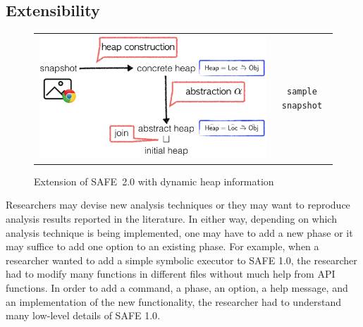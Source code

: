 \documentclass[10pt, conference]{IEEEtran}
\newcommand{\oldsafe}{{SAFE 1.0}\xspace}
\newcommand{\safe}{{SAFE~2.0}\xspace}
\begin{document}
\subsection{Extensibility}
\setcounter{figure}{2}
\begin{figure}[t]
\begin{tabular}{c|c|}\cline{2-2}
\begin{minipage}{.52\textwidth}
\includegraphics[width=\textwidth]{seip}
\end{minipage}
&
\begin{minipage}{.44\textwidth}
\small
\begin{verbatim}
sample snapshot
\end{verbatim}
\end{minipage}
\\\cline{2-2}
\end{tabular}
\vspace*{.5em}
\caption{\small Extension of \safe with dynamic heap information~\cite{safehybrid}}
\label{fig:seip}
\end{figure}

Researchers may devise new analysis techniques or they may want to
reproduce analysis results reported in the literature.  In either way,
depending on which analysis technique is being implemented, one may
have to add a new phase or it may suffice to add one option to an
existing phase.  For example, when a researcher wanted to add
a simple symbolic executor to \oldsafe, the researcher had to modify
many functions in different files without much help from API functions.
In order to add a command, a phase, an option, a help message, and an
implementation of the new functionality, the researcher had to understand
many low-level details of \oldsafe.
\end{document}
